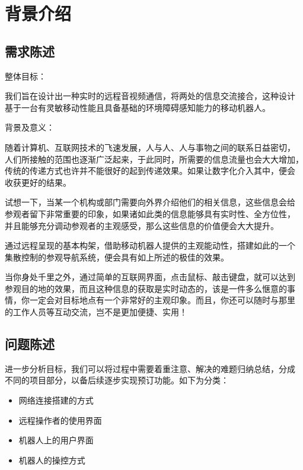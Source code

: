 \chapter{背景介绍}
\label{sec-context} %

\section{需求陈述}
\label{sec:need}

整体目标：

我们旨在设计出一种实时的远程音视频通信，将两处的信息交流接合，这种设计
基于一台有灵敏移动性能且具备基础的环境障碍感知能力的移动机器人。

背景及意义：

随着计算机、互联网技术的飞速发展，人与人、人与事物之间的联系日益密切，
人们所接触的范围也逐渐广泛起来，于此同时，所需要的信息流量也会大大增加，
传统的传递方式也许并不能很好的起到传递效果。如果让数字化介入其中，便会
收获更好的结果。

试想一下，当某一个机构或部门需要向外界介绍他们的相关信息，这些信息会给
参观者留下非常重要的印象，如果诸如此类的信息能够具有实时性、全方位性，
并且能够充分调动参观者的主观感受，那么这些信息的价值便会大大提升。

通过远程呈现的基本构架，借助移动机器人提供的主观能动性，搭建如此的一个
集散控制的参观导航系统，便会具有如上所述的极佳的效果。

当你身处千里之外，通过简单的互联网界面，点击鼠标、敲击键盘，就可以达到
参观目的地的效果，而且这种信息的获取是实时动态的，该是一件多么惬意的事
情，你一定会对目标地点有一个非常好的主观印象。而且，你还可以随时与那里
的工作人员等互动交流，岂不是更加便捷、实用！

\section{问题陈述}
\label{sec:problem}

进一步分析目标，我们可以将过程中需要着重注意、解决的难题归纳总结，分成
不同的项目部分，以备后续逐步实现预订功能。如下为分类：

\begin{itemize} \tightlist
\item 网络连接搭建的方式

\item 远程操作者的使用界面

\item 机器人上的用户界面

\item 机器人的操控方式

\end{itemize}

